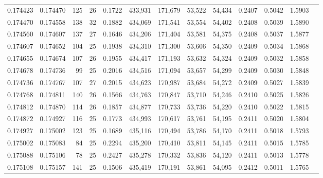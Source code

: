\begin{tabular}{rrrrrrrrrrrrr}
0.174423 & 0.174470 & 125 &  26 &                                     0.1722 & 433,931 & 171,679 &  53,522 &  54,434 & 0.2407 & 0.5042 & 1.5903 \\
0.174470 & 0.174558 & 138 &  32 &                                     0.1882 & 434,069 & 171,541 &  53,554 &  54,402 & 0.2408 & 0.5039 & 1.5890 \\
0.174560 & 0.174607 & 137 &  27 &                                     0.1646 & 434,206 & 171,404 &  53,581 &  54,375 & 0.2408 & 0.5037 & 1.5877 \\
0.174607 & 0.174652 & 104 &  25 &                                     0.1938 & 434,310 & 171,300 &  53,606 &  54,350 & 0.2409 & 0.5034 & 1.5868 \\
0.174655 & 0.174674 & 107 &  26 &                                     0.1955 & 434,417 & 171,193 &  53,632 &  54,324 & 0.2409 & 0.5032 & 1.5858 \\
0.174678 & 0.174736 &  99 &  25 &                                     0.2016 & 434,516 & 171,094 &  53,657 &  54,299 & 0.2409 & 0.5030 & 1.5848 \\
0.174736 & 0.174767 & 107 &  27 &                                     0.2015 & 434,623 & 170,987 &  53,684 &  54,272 & 0.2409 & 0.5027 & 1.5839 \\
0.174768 & 0.174811 & 140 &  26 &                                     0.1566 & 434,763 & 170,847 &  53,710 &  54,246 & 0.2410 & 0.5025 & 1.5826 \\
0.174812 & 0.174870 & 114 &  26 &                                     0.1857 & 434,877 & 170,733 &  53,736 &  54,220 & 0.2410 & 0.5022 & 1.5815 \\
0.174872 & 0.174927 & 116 &  25 &                                     0.1773 & 434,993 & 170,617 &  53,761 &  54,195 & 0.2411 & 0.5020 & 1.5804 \\
0.174927 & 0.175002 & 123 &  25 &                                     0.1689 & 435,116 & 170,494 &  53,786 &  54,170 & 0.2411 & 0.5018 & 1.5793 \\
0.175002 & 0.175083 &  84 &  25 &                                     0.2294 & 435,200 & 170,410 &  53,811 &  54,145 & 0.2411 & 0.5015 & 1.5785 \\
0.175088 & 0.175106 &  78 &  25 &                                     0.2427 & 435,278 & 170,332 &  53,836 &  54,120 & 0.2411 & 0.5013 & 1.5778 \\
0.175108 & 0.175157 & 141 &  25 &                                     0.1506 & 435,419 & 170,191 &  53,861 &  54,095 & 0.2412 & 0.5011 & 1.5765 \\

\end{tabular}
